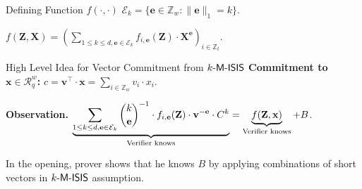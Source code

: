 \begin{frame}{Defining Function $f(\cdot, \cdot)$}
	$\mathcal{E}_k = \{\mathbf{e} \in \mathbb{Z}_w : \lVert\mathbf{e}\rVert_1 = k\}$.
	
	$\displaystyle f(\mathbf{Z}, \mathbf{X}) = \left(\sum_{1 \leq k \leq d, \mathbf{e} \in \mathcal{E}_k} f_{i,\mathbf{e}}(\mathbf{Z}) \cdot\mathbf{X}^\mathbf{e}\right)_{i \in \mathbb{Z}_t}$.
\end{frame}
\begin{frame}{High Level Idea for Vector Commitment from $k\textsf{-M-ISIS}$}
	\textbf{Commitment to $\mathbf{x} \in \mathcal{R}_q^{w}$:} $c = \mathbf{v}^\top \cdot \mathbf{x} = \sum_{i \in \mathbb{Z}_w}v_i\cdot x_i$.
	
	\textbf{Observation.} $\underbrace{\sum_{1\leq k\leq d, \mathbf{e} \in \mathcal{E}_k}\binom{k}{\mathbf{e}}^{-1}\cdot f_{i,\mathbf{e}}(\mathbf{Z})\cdot \mathbf{v}^{-\mathbf{e}}\cdot C^k}_{\text{\text{Verifier knows}}} = \underbrace{f(\mathbf{Z}, \mathbf{x})}_{\text{\text{Verifier knows}}} + B$. 
	
	In the opening, prover shows that he knows $B$ by applying combinations of short vectors in $k\textsf{-M-ISIS}$ assumption.
\end{frame}